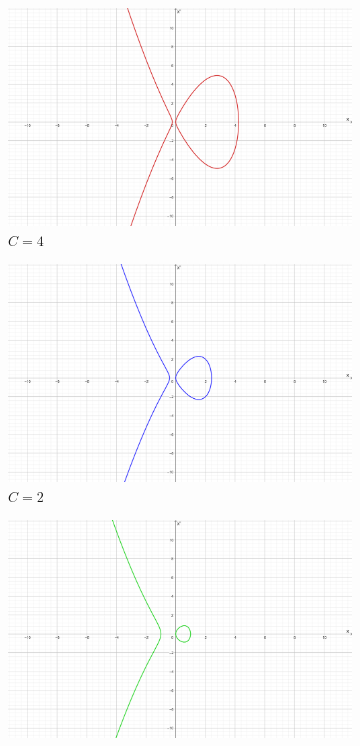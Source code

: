 \documentclass{article}
\begin{document}
 \begin{figure}
\centering
\begin{subfigure}{0.45\textwidth}
  \includegraphics[width=\textwidth]{C=4.png}
  \caption{$C = 4$ }
\end{subfigure}\hfill%
\begin{subfigure}{0.45\textwidth}
  \includegraphics[width=\textwidth]{C=2.png}
  \caption{$C = 2$}
  \end{subfigure}\hfill
  \begin{subfigure}{0.45\textwidth}
  \includegraphics[width=\textwidth]{C=0.png}

\end{subfigure}
\end{figure}
\end{document}
